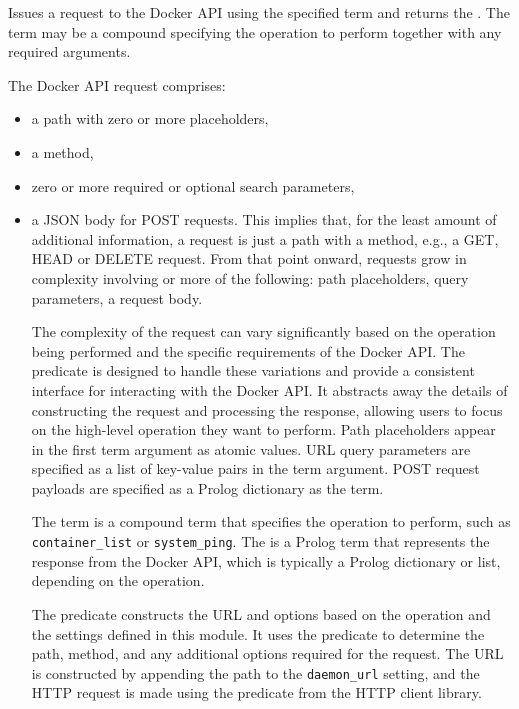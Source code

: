 \begin{description}
Issues a request to the Docker API using the specified  term and
returns the . The  term may be a compound specifying the
operation to perform together with any required arguments.

The Docker API request comprises:

\begin{itemize}
    \item a path with zero or more placeholders,
    \item a method,
    \item zero or more required or optional search parameters,
    \item a JSON body for POST requests.
This implies that, for the least amount of additional information, a
request is just a path with a method, e.g., a GET, HEAD or DELETE
request. From that point onward, requests grow in complexity
involving or more of the following: path placeholders, query
parameters, a request body.

The complexity of the request can vary significantly based on the
operation being performed and the specific requirements of the
Docker API. The  predicate is designed to handle these
variations and provide a consistent interface for interacting with
the Docker API. It abstracts away the details of constructing the
request and processing the response, allowing users to focus on
the high-level operation they want to perform. Path placeholders
appear in the first  term argument as atomic values. URL query parameters
are specified as a list of key-value pairs in the  term argument.
POST request payloads are specified as a Prolog dictionary as the  term.

The  term is a compound term that specifies the operation to
perform, such as \verb$container_list$ or \verb$system_ping$. The  is a
Prolog term that represents the response from the Docker API, which
is typically a Prolog dictionary or list, depending on the operation.

The predicate constructs the URL and options based on the operation
and the settings defined in this module. It uses the  predicate
to determine the path, method, and any additional options required for
the request. The URL is constructed by appending the path to the
\verb$daemon_url$ setting, and the HTTP request is made using the
 predicate from the HTTP client library.


\end{itemize}
\end{description}
